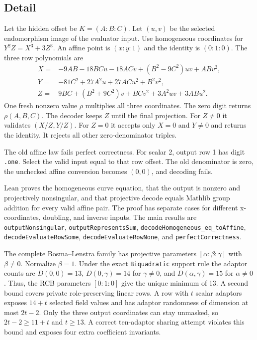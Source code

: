 \documentclass[10pt]{article}
\begin{document}
\subsection{Detail}
Let the hidden offset be $K=(A:B:C)$.
Let $(u,v)$ be the selected endomorphism image of the evaluator input.
Use homogeneous coordinates for $Y^2Z=X^3+3Z^3$.
An affine point is $(x:y:1)$ and the identity is $(0:1:0)$.
The three row polynomials are
\begin{align*}
 X={}&-9AB-18BCu-18ACv+(B^2-9C^2)uv+ABv^2,\\
 Y={}&-81C^2+27A^2u+27ACu^2+B^2v^2,\\
 Z={}&9BC+(B^2+9C^2)v+BCv^2+3A^2uv+3ABu^2.
\end{align*}
One fresh nonzero value $\rho$ multiplies all three coordinates.
The zero digit returns $\rho(A,B,C)$.
The decoder keeps $Z$ until the final projection.
For $Z\ne0$ it validates $(X/Z,Y/Z)$.
For $Z=0$ it accepts only $X=0$ and $Y\ne0$ and returns the identity.
It rejects all other zero-denominator triples.

The old affine law fails perfect correctness.
For scalar 2, output row 1 has digit \texttt{.one}.
Select the valid input equal to that row offset.
The old denominator is zero, the unchecked affine conversion becomes $(0,0)$, and decoding fails.

Lean proves the homogeneous curve equation, that the output is nonzero and projectively nonsingular, and that projective decode equals Mathlib group addition for every valid affine pair.
The proof has separate cases for different x-coordinates, doubling, and inverse inputs.
The main results are \texttt{outputNonsingular}, \texttt{outputRepresentsSum}, \texttt{decodeHomogeneous\_eq\_toAffine}, \texttt{decodeEvaluateRowSome}, \texttt{decodeEvaluateRowNone}, and \texttt{perfectCorrectness}.

The complete Bosma--Lenstra family has projective parameters $[\alpha:\beta:\gamma]$ with $\beta\ne0$.
Normalize $\beta=1$.
Under the exact \texttt{Biquadratic} support rule the adaptor counts are $D(0,0)=13$, $D(0,\gamma)=14$ for $\gamma\ne0$, and $D(\alpha,\gamma)=15$ for $\alpha\ne0$.
Thus, the RCB parameters $[0:1:0]$ give the unique minimum of 13.
A second bound covers private role-preserving linear rows.
A row with $t$ scalar adaptors exposes $14+t$ selected field values and has adaptor randomness of dimension at most $2t-2$.
Only the three output coordinates can stay unmasked, so $2t-2\ge 11+t$ and $t\ge13$.
A correct ten-adaptor sharing attempt violates this bound and exposes four extra coefficient invariants.
\end{document}
